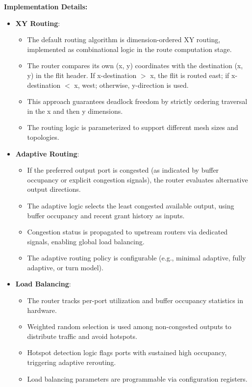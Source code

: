 \documentclass[11pt,a4paper]{article}
\begin{document}
\textbf{Implementation Details:}
\begin{itemize}
    \item \textbf{XY Routing}:
    \begin{itemize}
        \item The default routing algorithm is dimension-ordered XY routing, implemented as combinational logic in the route computation stage.
        \item The router compares its own (x, y) coordinates with the destination (x, y) in the flit header. If x-destination $>$ x, the flit is routed east; if x-destination $<$ x, west; otherwise, y-direction is used.
        \item This approach guarantees deadlock freedom by strictly ordering traversal in the x and then y dimensions.
        \item The routing logic is parameterized to support different mesh sizes and topologies.
    \end{itemize}
    \item \textbf{Adaptive Routing}:
    \begin{itemize}
        \item If the preferred output port is congested (as indicated by buffer occupancy or explicit congestion signals), the router evaluates alternative output directions.
        \item The adaptive logic selects the least congested available output, using buffer occupancy and recent grant history as inputs.
        \item Congestion status is propagated to upstream routers via dedicated signals, enabling global load balancing.
        \item The adaptive routing policy is configurable (e.g., minimal adaptive, fully adaptive, or turn model).
    \end{itemize}
    \item \textbf{Load Balancing}:
    \begin{itemize}
        \item The router tracks per-port utilization and buffer occupancy statistics in hardware.
        \item Weighted random selection is used among non-congested outputs to distribute traffic and avoid hotspots.
        \item Hotspot detection logic flags ports with sustained high occupancy, triggering adaptive rerouting.
        \item Load balancing parameters are programmable via configuration registers.

\end{itemize}
\end{itemize}
\end{document}
